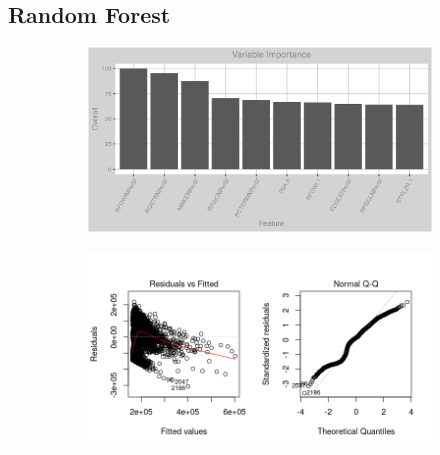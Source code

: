 \subsection{Random Forest}
\label{appendix:electricity:rf}
\begin{figure}[h]
\centering
\begin{subfigure}{1\textwidth}
\centering
\includegraphics[width=.99\textwidth, height=0.35\textheight]{Images/electricity_psf_rf_vars.png}
\end{subfigure}
\begin{subfigure}{1\textwidth}
\centering
\includegraphics[width=.99\textwidth, height=0.4\textheight]{Images/electricity_psf_rf_res_1.png}
\end{subfigure}
\end{figure}
\FloatBarrier
\newpage
